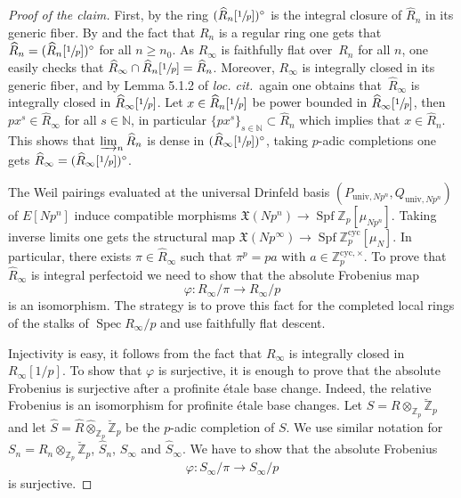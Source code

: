 \documentclass[11pt]{article}
\providecommand{\loccit}{\emph{loc. cit.}}
\newcommand{\cyc}{\mathrm{cyc}}
\newcommand{\univ}{\mathrm{univ}}
\newcommand{\wotimes}{\mathbin{\widehat\otimes}}
\numberwithin{equation}{section}
\theoremstyle{definition}
\newcommand{\bb}[1]{\mathbb{#1}}
\newcommand{\f}[1]{\mathfrak{#1}}
\DeclareMathOperator{\Spf}{Spf}
\DeclareMathOperator{\Spec}{Spec}
\begin{document}
\begin{proof}[Proof of the claim]
First, by \cite[Lem.\,A.2.2.3]{Heuer2019PerfectoidGO} the ring $(\widehat{R}_n[\sfrac{1}{p}])^{\circ}$ is the integral closure of $\widehat{R}_n$ in its generic fiber. By \cite[Lem.\,5.1.2]{BhattLectures} and the fact that $R_n$ is a regular ring one gets that $\widehat{R}_n=(\widehat{R}_n[\sfrac{1}{p}])^{\circ}$ for all $n\geq n_0$. As $R_{\infty}$ is faithfully flat over~$R_n$ for all $n$, one easily checks that $\widehat{R}_{\infty}\cap \widehat{R}_n[\sfrac{1}{p}]=\widehat{R}_{n}$. Moreover, $R_{\infty}$ is integrally closed in its generic fiber, and by Lemma 5.1.2 of \loccit\ again one obtains that~$\widehat{R}_{\infty}$ is integrally closed in $\widehat{R}_{\infty}[\sfrac{1}{p}]$. Let $x\in \widehat{R}_n[\sfrac{1}{p}]$ be power bounded in $\widehat{R}_{\infty}[\sfrac{1}{p}]$, then $px^s\in \widehat{R}_{\infty}$ for all $s\in \bb{N}$, in particular $\{px^s\}_{s\in \bb{N}}\subset \widehat{R}_n$ which implies that $x\in \widehat{R}_n$. This shows that $\varinjlim_{n} \widehat{R}_n$ is dense in $(\widehat{R}_{\infty}[\sfrac{1}{p}])^{\circ}$, taking $p$-adic completions one gets $\widehat{R}_{\infty}=(\widehat{R}_{\infty}[\sfrac{1}{p}])^{\circ}$.

The Weil pairings evaluated at the universal Drinfeld basis $(P_{\univ,Np^n},Q_{\univ,Np^n})$ of $E[Np^n]$ induce compatible morphisms $\f{X}(Np^n)\to \Spf \bb{Z}_p[\mu_{Np^n}]$. Taking inverse limits one gets the structural map $\f{X}(Np^\infty)\to \Spf \bb{Z}_p^{\cyc}[\mu_N]$. In particular, there exists $\pi\in \widehat{R}_{\infty}$ such that $\pi^p=pa$ with $a\in \bb{Z}_p^{\cyc,\times}$. To prove that $\widehat{R}_{\infty}$ is integral perfectoid we need to show that the absolute Frobenius map\vspace*{-3pt}
\[
\varphi: R_{\infty}/\pi \to R_{\infty}/p
\]
is an isomorphism. The strategy is to prove this fact for the completed local rings of the stalks of $\Spec R_{\infty}/p$ and use faithfully flat descent.

Injectivity is easy, it follows from the fact that $R_{\infty}$ is integrally closed in $R_{\infty}[1/p]$. To show that $\varphi$ is surjective, it is enough to prove that the absolute Frobenius is surjective after a profinite étale base change. Indeed, the relative Frobenius is an isomorphism for profinite étale base changes. Let $S= R\otimes_{\bb{Z}_p} \breve{\bb{Z}}_p$ and let $\widehat{S}= \widehat{R}\wotimes_{\bb{Z}_p} \breve{\bb{Z}}_p$ be the $p$-adic completion of $S$. We use similar notation for $S_n= R_n\otimes_{\bb{Z}_p} \breve{\bb{Z}}_p$, $\widehat{S}_n$, $S_\infty$ and $\widehat{S}_{\infty}$. We have to show that the absolute Frobenius\vspace*{-3pt}
\begin{equation*}
\varphi: S_{\infty}/\pi\to S_{\infty}/p
\end{equation*}
is surjective.


\end{proof}
\end{document}
